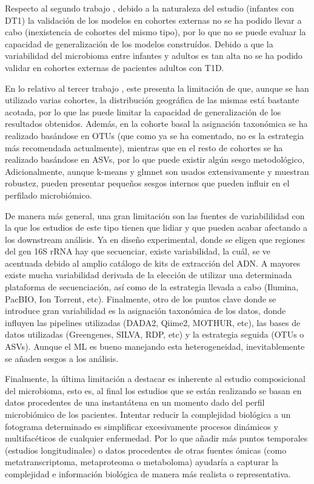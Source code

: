 Respecto al segundo trabajo \cite{paper2}, debido a la naturaleza del estudio (infantes con DT1) la validación de los modelos en cohortes externas no se ha podido llevar a cabo (inexistencia de cohortes del mismo tipo), por lo que no se puede evaluar la capacidad de generalización de los modelos construídos. Debido a que la variabilidad del microbioma entre infantes y adultos es tan alta no se ha podido validar en cohortes externas de pacientes adultos con T1D.

En lo relativo al tercer trabajo \cite{paper3}, este presenta la limitación de que, aunque se han utilizado varias cohortes, la distribución geográfica de las mismas está bastante acotada, por lo que las puede limitar la capacidad de generalización de los resultados obtenidos. Además, en la cohorte basal la asignación taxonómica se ha realizado basándose en OTUs (que como ya se ha comentado, no es la estrategia más recomendada actualmente), mientras que en el resto de cohortes se ha realizado basándose en ASVs, por lo que puede existir algún sesgo metodológico, Adicionalmente, aunque k-means y glmnet son usados extensivamente y muestran robustez, pueden presentar pequeños sesgos internos que pueden influir en el perfilado microbiómico.

De manera más general, una gran limitación son las fuentes de variabililidad con la que los estudios de este tipo tienen que lidiar y que pueden acabar afectando a los downstream análisis. Ya en diseño experimental, donde se eligen que regiones del gen 16S rRNA hay que secuenciar, existe variabilidad, la cuál, se ve acentuada debido al amplio catálogo de kits de extracción del ADN. A mayores existe mucha variabilidad derivada de la elección de utilizar una determinada plataforma de secuenciación, así como de la estrategia llevada a cabo (Ilumina, PacBIO, Ion Torrent, etc). Finalmente, otro de los puntos clave donde se introduce gran variabilidad es la asignación taxonómica de los datos, donde influyen las pipelines utilizadas (DADA2, Qiime2, MOTHUR, etc), las bases de datos utilizadas (Greengenes, SILVA, RDP, etc) y la estrategia seguida (OTUs o ASVs). Aunque el ML es bueno manejando esta heterogeneidad, inevitablemente se añaden sesgos a los análisis.

Finalmente, la última limitación a destacar es inherente al estudio composicional del microbioma, esto es, al final los estudios que se están realizando se basan en datos procedentes de una instantátena en un momento dado del perfil microbiómico de los pacientes. Intentar reducir la complejidad biológica a un fotograma determinado es simplificar excesivamente procesos dinámicos y multifacéticos de cualquier enfermedad.
Por lo que añadir más puntos temporales (estudios longitudinales) o datos procedentes de otras fuentes ómicas (como metatranscriptoma, metaproteoma o metaboloma) ayudaría a capturar la complejidad e información biológica de manera más realista o representativa.


